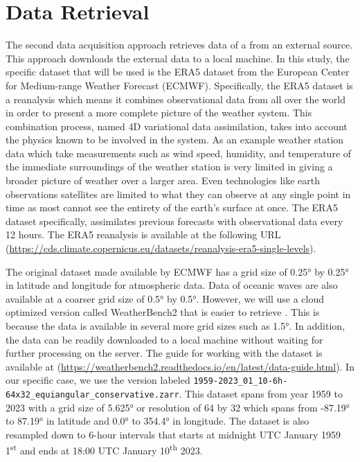 \section{Data Retrieval}\label{sec:data_retrieval}
\noindent The second data acquisition approach retrieves data of a from an external source. This approach downloads the external data to a local machine. In this study, the specific dataset that will be used is the ERA5 dataset from the European Center for Medium-range Weather Forecast (ECMWF). Specifically, the ERA5 dataset is a reanalysis which means it combines observational data from all over the world in order to present a more complete picture of the weather system. This combination process, named 4D variational data assimilation, takes into account the physics known to be involved in the system. As an example weather station data which take measurements such as wind speed, humidity, and temperature of the immediate surroundings of the weather station is very limited in giving a broader picture of weather over a larger area. Even technologies like earth observations satellites are limited to what they can observe at any single point in time as most cannot see the entirety of the earth's surface at once. The ERA5 dataset specifically, assimilates previous forecasts with observational data every 12 hours. The ERA5 reanalysis is available at the following URL (\url{https://cds.climate.copernicus.eu/datasets/reanalysis-era5-single-levels}).

The original dataset made available by ECMWF has a grid size of \ang{0.25} by \ang{0.25} in latitude and longitude for atmospheric data. Data of oceanic waves are also available at a coarser grid size of \ang{0.5} by \ang{0.5}. However, we will use a cloud optimized version called WeatherBench2 that is easier to retrieve \autocite{raspWeatherBench2Benchmark2023}. This is because the data is available in several more grid sizes such as \ang{1.5}. In addition, the data can be readily downloaded to a local machine without waiting for further processing on the server. The guide for working with the dataset is available at (\url{https://weatherbench2.readthedocs.io/en/latest/data-guide.html}). In our specific case, we use the version labeled \verb|1959-2023_01_10-6h-64x32_equiangular_conservative.zarr|. This dataset spans from year 1959 to 2023 with a grid size of \ang{5.625} or resolution of 64 by 32 which spans from \ang{-87.19} to \ang{87.19} in latitude and \ang{0.0} to \ang{354.4} in longitude. The dataset is also resampled down to 6-hour intervals that starts at midnight UTC January 1959 1\textsuperscript{st} and ends at 18:00 UTC January 10\textsuperscript{th} 2023.

